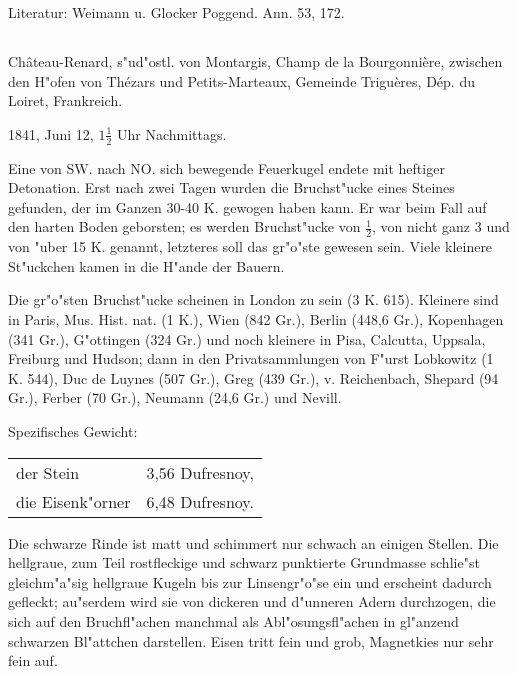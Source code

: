 \documentclass[a4paper, 11pt, oneside]{article}
\begin{document}
\normalsize
Literatur: Weimann u. Glocker Poggend. Ann. 53, 172.

\subsection{}
\LARGE
\paragraph{}
Château-Renard, s"ud"ostl. von Montargis, Champ de la Bourgonnière, zwischen den H"ofen von Thézars und Petits-Marteaux, Gemeinde Triguères, Dép. du Loiret, Frankreich.

1841, Juni 12, $\mathfrak{1\frac{1}{2}}$ Uhr Nachmittags.

Eine von SW. nach NO. sich bewegende Feuerkugel endete mit heftiger Detonation. Erst nach zwei Tagen wurden die Bruchst"ucke eines Steines gefunden, der im Ganzen 30-40 K. gewogen haben kann. Er war beim Fall auf den harten Boden geborsten; es werden Bruchst"ucke von $\mathfrak{\frac{1}{2}}$, von nicht ganz 3 und von "uber 15 K. genannt, letzteres soll das gr"o"ste gewesen sein. Viele kleinere St"uckchen kamen in die H"ande der Bauern.

Die gr"o"sten Bruchst"ucke scheinen in London zu sein (3 K. 615). Kleinere sind in Paris, Mus. Hist. nat. (1 K.), Wien (842 Gr.), Berlin (448,6 Gr.), Kopenhagen (341 Gr.), G"ottingen (324 Gr.) und noch kleinere in Pisa, Calcutta, Uppsala, Freiburg und Hudson; dann in den Privatsammlungen von F"urst Lobkowitz (1 K. 544), Duc de Luynes (507 Gr.), Greg (439 Gr.), v. Reichenbach, Shepard (94 Gr.), Ferber (70 Gr.), Neumann (24,6 Gr.) und Nevill.

Spezifisches Gewicht:  
\begin{table}[!ht]
    \centering\swabfamily\Large
    \begin{tabular}{l l}
        der Stein & 3,56 Dufresnoy,\\
        die Eisenk"orner & 6,48 Dufresnoy.
    \end{tabular}
\end{table}

Die schwarze Rinde ist matt und schimmert nur schwach an einigen Stellen. Die hellgraue, zum Teil rostfleckige und schwarz punktierte Grundmasse schlie"st gleichm"a"sig hellgraue Kugeln bis zur Linsengr"o"se ein und erscheint dadurch gefleckt; au"serdem wird sie von dickeren und d"unneren Adern durchzogen, die sich auf den Bruchfl"achen manchmal als Abl"osungsfl"achen in gl"anzend schwarzen Bl"attchen darstellen. Eisen tritt fein und grob, Magnetkies nur sehr fein auf.
\end{document}
